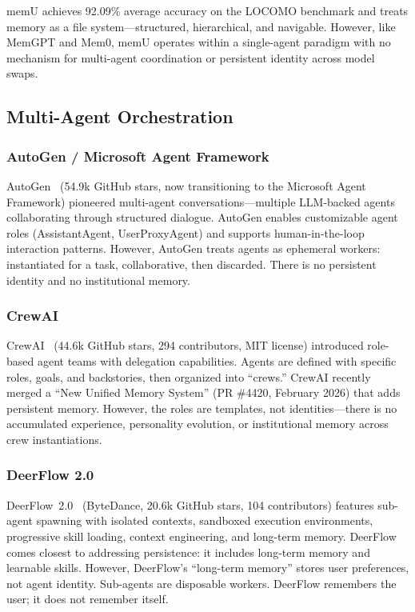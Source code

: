 \documentclass[11pt,a4paper]{article}
\begin{document}
memU achieves 92.09\% average accuracy on the LOCOMO benchmark and treats memory as a file system---structured, hierarchical, and navigable. However, like MemGPT and Mem0, memU operates within a single-agent paradigm with no mechanism for multi-agent coordination or persistent identity across model swaps.


\subsection{Multi-Agent Orchestration}
\label{sec:multi-agent}

\subsubsection{AutoGen / Microsoft Agent Framework}

AutoGen~\citep{autogen2024} (54.9k GitHub stars, now transitioning to the Microsoft Agent Framework) pioneered multi-agent conversations---multiple LLM-backed agents collaborating through structured dialogue. AutoGen enables customizable agent roles (AssistantAgent, UserProxyAgent) and supports human-in-the-loop interaction patterns. However, AutoGen treats agents as ephemeral workers: instantiated for a task, collaborative, then discarded. There is no persistent identity and no institutional memory.


\subsubsection{CrewAI}

CrewAI~\citep{crewai2024} (44.6k GitHub stars, 294 contributors, MIT license) introduced role-based agent teams with delegation capabilities. Agents are defined with specific roles, goals, and backstories, then organized into ``crews.'' CrewAI recently merged a ``New Unified Memory System'' (PR \#4420, February 2026) that adds persistent memory. However, the roles are templates, not identities---there is no accumulated experience, personality evolution, or institutional memory across crew instantiations.


\subsubsection{DeerFlow 2.0}

DeerFlow~2.0~\citep{deerflow2025} (ByteDance, 20.6k GitHub stars, 104 contributors) features sub-agent spawning with isolated contexts, sandboxed execution environments, progressive skill loading, context engineering, and long-term memory. DeerFlow comes closest to addressing persistence: it includes long-term memory and learnable skills. However, DeerFlow's ``long-term memory'' stores user preferences, not agent identity. Sub-agents are disposable workers. DeerFlow remembers the user; it does not remember itself.
\end{document}
